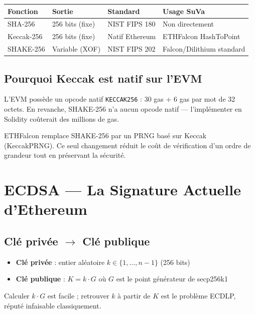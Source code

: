 \documentclass[11pt,a4paper]{article}
\begin{document}
\begin{center}
\begin{tabular}{llll}
\toprule
\textbf{Fonction} & \textbf{Sortie} & \textbf{Standard} & \textbf{Usage SuVa} \\
\midrule
SHA-256    & 256 bits (fixe)  & NIST FIPS 180  & Non directement \\
Keccak-256 & 256 bits (fixe)  & Natif Ethereum & ETHFalcon HashToPoint \\
SHAKE-256  & Variable (XOF)   & NIST FIPS 202  & Falcon/Dilithium standard \\
\bottomrule
\end{tabular}
\end{center}

\subsection{Pourquoi Keccak est natif sur l'EVM}

L'EVM possède un opcode natif \texttt{KECCAK256} : 30 gas + 6 gas par mot de 32 octets. En revanche, SHAKE-256 n'a aucun opcode natif --- l'implémenter en Solidity coûterait des millions de gas.

\begin{resultbox}
ETHFalcon remplace SHAKE-256 par un PRNG basé sur Keccak (KeccakPRNG). Ce seul changement réduit le coût de vérification d'un ordre de grandeur tout en préservant la sécurité.
\end{resultbox}

\section{ECDSA --- La Signature Actuelle d'Ethereum}

\subsection{Clé privée $\to$ Clé publique}

\begin{itemize}
  \item \textbf{Clé privée} : entier aléatoire $k \in \{1, \ldots, n-1\}$ (256 bits)
  \item \textbf{Clé publique} : $K = k \cdot G$ où $G$ est le point générateur de secp256k1
\end{itemize}

Calculer $k \cdot G$ est facile ; retrouver $k$ à partir de $K$ est le problème ECDLP, réputé infaisable classiquement.
\end{document}
